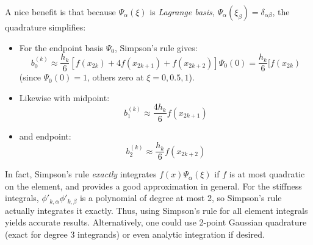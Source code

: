 \documentclass[a4paper,10pt]{article}
\begin{document}
A nice benefit is that because \(\Psi_\alpha(\xi)\) is \emph{Lagrange basis}, \(\Psi_{\alpha}(\xi_\beta) = \delta_{\alpha\beta}\), the quadrature simplifies:

\begin{itemize}
	\item For the endpoint basis \(\Psi_0\), Simpson's rule gives:
	\[
	b^{(k)}_0 \approx \frac{h_k}{6}[f(x_{2k}) + 4f(x_{2k+1}) + f(x_{2k+2})] \Psi_0(0) = \frac{h_k}{6}[f(x_{2k})
	\] 
	(since \(\Psi_0(0)=1\), others zero at \(\xi=0,0.5,1\)).
	\item Likewise with midpoint:
	\[
	b^{(k)}_1 \approx \frac{4h_k}{6} f(x_{2k+1})
	\]
	\item and endpoint:
	\[
	b^{(k)}_2 \approx \frac{h_k}{6} f(x_{2k+2}) 	
	\]
\end{itemize}

In fact, Simpson's rule \emph{exactly} integrates \(f(x)\Psi_\alpha(\xi)\) if \(f\) is at most quadratic on the element, and provides a good approximation in general.
For the stiffness integrals, \(\phi'_{k,\alpha}\phi'_{k,\beta}\) is a polynomial of degree at most 2, so Simpson's rule actually integrates it exactly.
Thus, using Simpson's rule for all element integrals yields accurate results.
Alternatively, one could use 2-point Gaussian quadrature (exact for degree 3 integrands) or even analytic integration if desired.
\end{document}
